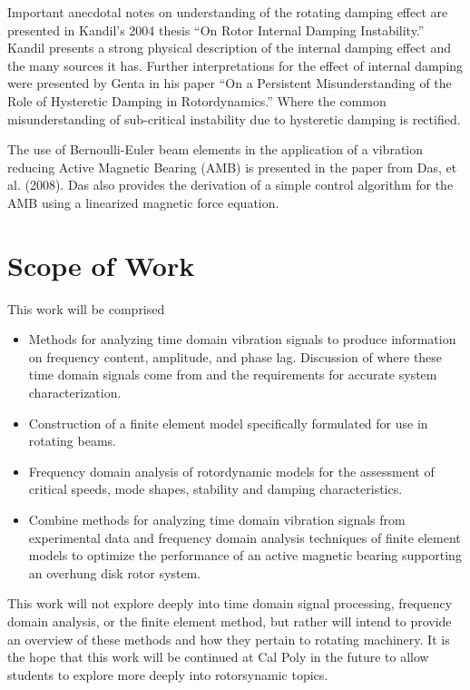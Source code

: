 Important anecdotal notes on understanding of the rotating damping effect are presented in Kandil's 2004\cite{kandil2005rotor} thesis ``On Rotor Internal Damping Instability.'' Kandil presents a strong physical description of the internal damping effect and the many sources it has. Further interpretations for the effect of internal damping were presented by Genta in his paper ``On a Persistent Misunderstanding of the Role of Hysteretic Damping in Rotordynamics.'' Where the common misunderstanding of sub-critical instability due to hysteretic damping is rectified.\par 
The use of Bernoulli-Euler beam elements in the application of a vibration reducing Active Magnetic Bearing (AMB) is presented in the paper from Das, et al. (2008\cite{das2008vibration}). Das also provides the derivation of a simple control algorithm for the AMB using a linearized magnetic force equation.\par
\section{Scope of Work}
This work will be comprised 
\begin{itemize}
	\item Methods for analyzing time domain vibration signals to produce information on frequency content, amplitude, and phase lag. Discussion of where these time domain signals come from and the requirements for accurate system characterization.
	\item Construction of a finite element model specifically formulated for use in rotating beams.
	\item Frequency domain analysis of rotordynamic models for the assessment of critical speeds, mode shapes, stability and damping characteristics.
	\item Combine methods for analyzing time domain vibration signals from experimental data and frequency domain analysis techniques of finite element models to optimize the performance of an active magnetic bearing supporting an overhung disk rotor system.
\end{itemize}
This work will not explore deeply into time domain signal processing, frequency domain analysis, or the finite element method, but rather will intend to provide an overview of these methods and how they pertain to rotating machinery. It is the hope that this work will be continued at Cal Poly in the future to allow students to explore more deeply into rotorsynamic topics.\par